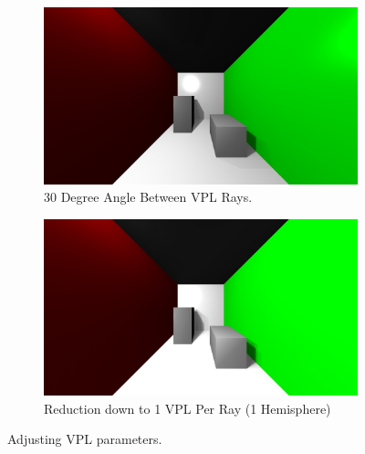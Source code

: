 \begin{figure}
        \centering
        \begin{subfigure}[b]{1.0\textwidth}
                \includegraphics[width=\textwidth]{3.jpg}
                \caption{30 Degree Angle Between VPL Rays.}
                \label{fig:VPLangleIncrease}
        \end{subfigure}
        \begin{subfigure}[b]{1.0\textwidth}
                \includegraphics[width=\textwidth]{7.jpg}
                \caption{Reduction down to 1 VPL Per Ray (1 Hemisphere)}
                \label{fig:hemisphereReduction}
        \end{subfigure}
        \caption{Adjusting VPL parameters.}\label{fig:vplparameters}
\end{figure}


